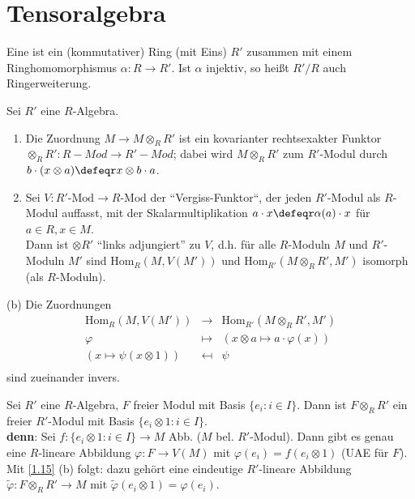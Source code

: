 \section{Tensoralgebra}

\begin{Def}
\label{1.14}
Eine  ist ein (kommutativer) Ring (mit Eins) $R'$
zusammen mit einem Ringhomomorphismus $\alpha: R\to R'$.
Ist $\alpha$ injektiv, so hei\ss t $R'/R$ auch Ringerweiterung.
\end{Def}

\begin{Bem}
\label{1.15}
Sei $R'$ eine $R$-Algebra.
\begin{enumerate}
\item Die Zuordnung $M\to M\otimes_R R'$ ist ein kovarianter rechtsexakter Funktor
$\otimes_R R':R-Mod\to R'-Mod$; dabei wird $M\otimes_R R'$ zum $R'$-Modul durch
$b\cdot (x\otimes a)\defeqr x\otimes b\cdot a$.
\item Sei $V: R'\mbox{-Mod}\to R\mbox{-Mod}$ der ``Vergiss-Funktor``, der jeden $R'$-Modul als 
$R$-Modul auffasst, mit der Skalarmultiplikation $a\cdot x\defeqr\alpha(a)\cdot x$
f\"ur $a\in R, x\in M$.\\
		Dann ist $\otimes R'$ ``links adjungiert'' zu $V$, d.h. f\"ur alle 
		$R$-Moduln $M$ und $R'$-Moduln $M'$ sind $\textrm{Hom}_R(M, V(M'))$ und 
		$\textrm{Hom}_{R'}(M\otimes_R R', M')$ isomorph (als $R$-Moduln).
		\end{enumerate}
		\end{Bem}

		\begin{Bew}
		\item[(b)] Die Zuordnungen $$\begin{array}{rcl}
		\textrm{Hom}_R(M, V(M')) & \to & \textrm{Hom}_{R'}(M\otimes_R R', M')\\
			\varphi & \mapsto & (x\otimes a\mapsto a\cdot \varphi(x))\\
			(x\mapsto \psi(x\otimes 1))&\mapsfrom & \psi \\
			\end{array}$$
			sind zueinander invers.
			\end{Bew}

			\begin{nnBsp}
			Sei $R'$ eine $R$-Algebra, $F$ freier Modul mit Basis $\{e_i:i\in I\}$. Dann ist $F\otimes_R R'$ ein freier
			$R'$-Modul mit Basis $\{e_i\otimes 1:i\in I\}$.\\
				\textbf{denn}: Sei $f:\{e_i\otimes 1: i\in I\} \to M$ Abb. ($M$ bel. $R'$-Modul).
				Dann gibt es genau eine $R$-lineare Abbildung $\varphi: F\to V(M)$ mit $\varphi(e_i)=f(e_i\otimes 1)$ (UAE f\"ur $F$).
				Mit \ref{1.15} (b) folgt: dazu geh\"ort eine eindeutige $R'$-lineare Abbildung
				$\tilde\varphi: F\otimes_R R'\to M$ mit $\tilde\varphi(e_i\otimes 1)=\varphi(e_i)$.
				\end{nnBsp}

